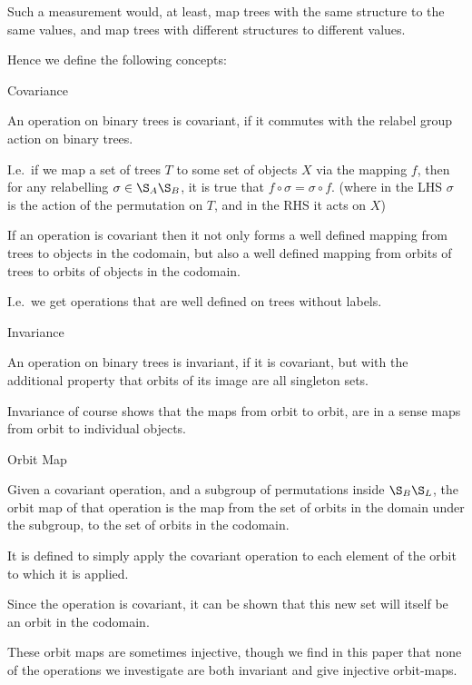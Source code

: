 \documentclass[10pt,a4paper]{report}
\begin{document}
Such a measurement would, at least, map trees with the same structure to the
same values, and map trees with different structures to different values.

Hence we define the following concepts:

\begin{definition} Covariance

	An operation on binary trees is covariant, if it commutes with the relabel
	group action on binary trees.

	I.e.\ if we map a set of trees $T$ to some set of objects $X$ via the
	mapping $f$, then for any relabelling $\sigma \in \S_A\S_B$, it is true
	that $f \circ \sigma = \sigma \circ f$. (where in the LHS $\sigma$ is the
	action of the permutation on $T$, and in the RHS it acts on $X$)
\end{definition}

If an operation is covariant then it not only forms a well defined mapping from
trees to objects in the codomain, but also a well defined mapping
from orbits of trees to orbits of objects in the codomain.

I.e.\ we get operations that are well defined on trees without labels.

\begin{definition} Invariance

	An operation on binary trees is invariant, if it is covariant, but with the
	additional property that orbits of its image are all singleton sets.
\end{definition}

Invariance of course shows that the maps from orbit to orbit, are in a sense
maps from orbit to individual objects.

\begin{definition} Orbit Map

	Given a covariant operation, and a subgroup of permutations inside
	$\S_B\S_L$, the orbit map of that operation is the map from the set
	of orbits in the domain under the subgroup, to the set of orbits in the
	codomain.

	It is defined to simply apply the covariant operation to each element of
	the orbit to which it is applied.

	Since the operation is covariant, it can be shown that this new set will
	itself be an orbit in the codomain.
\end{definition}

These orbit maps are sometimes injective, though we find in this paper that
none of the operations we investigate are both invariant and give injective
orbit-maps.
\end{document}
